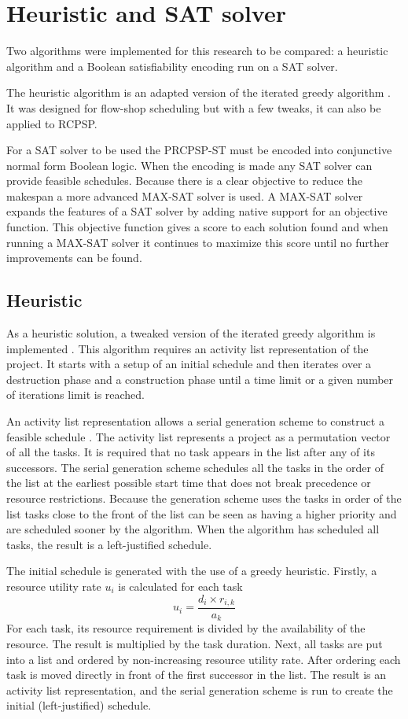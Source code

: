 \section{Heuristic and SAT solver} \label{section:your_contribution}
Two algorithms were implemented for this research to be compared: a heuristic algorithm and a Boolean satisfiability encoding run on a SAT solver.

The heuristic algorithm is an adapted version of the iterated greedy algorithm \cite{RN32}. It was designed for flow-shop scheduling but with a few tweaks, it can also be applied to RCPSP.

For a SAT solver to be used the PRCPSP-ST must be encoded into conjunctive normal form Boolean logic. When the encoding is made any SAT solver can provide feasible schedules. Because there is a clear objective to reduce the makespan a more advanced MAX-SAT solver is used. A MAX-SAT solver expands the features of a SAT solver by adding native support for an objective function. This objective function gives a score to each solution found and when running a MAX-SAT solver it continues to maximize this score until no further improvements can be found.

\subsection{Heuristic}
As a heuristic solution, a tweaked version of the iterated greedy algorithm is implemented \cite{RN32}. This algorithm requires an activity list representation of the project. It starts with a setup of an initial schedule and then iterates over a destruction phase and a construction phase until a time limit or a given number of iterations limit is reached. 

An activity list representation allows a serial generation scheme to construct a feasible schedule \cite{RN46}. The activity list represents a project as a permutation vector of all the tasks. It is required that no task appears in the list after any of its successors. The serial generation scheme schedules all the tasks in the order of the list at the earliest possible start time that does not break precedence or resource restrictions. Because the generation scheme uses the tasks in order of the list tasks close to the front of the list can be seen as having a higher priority and are scheduled sooner by the algorithm. When the algorithm has scheduled all tasks, the result is a left-justified schedule.

The initial schedule is generated with the use of a greedy heuristic. Firstly, a resource utility rate \(u_i\) is calculated for each task 
\begin{equation}
u_i=\frac{d_i \times r_{i,k}}{a_k} 
\end{equation}
For each task, its resource requirement is divided by the availability of the resource. The result is multiplied by the task duration. Next, all tasks are put into a list and ordered by non-increasing resource utility rate. After ordering each task is moved directly in front of the first successor in the list. The result is an activity list representation, and the serial generation scheme is run to create the initial (left-justified) schedule.

